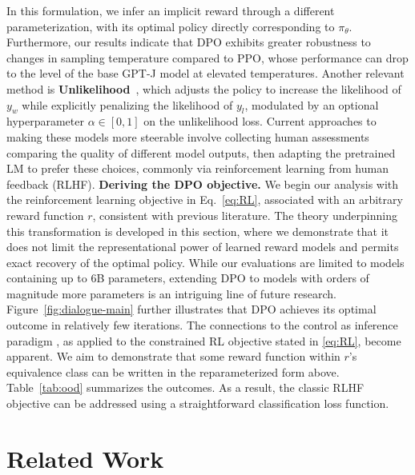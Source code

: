 In this formulation, we infer an implicit reward through a different parameterization, with its optimal policy directly corresponding to $\pi_\theta$. Furthermore, our results indicate that DPO exhibits greater robustness to changes in sampling temperature compared to PPO, whose performance can drop to the level of the base GPT-J model at elevated temperatures. Another relevant method is \textbf{Unlikelihood}~\citep{welleck2019neural}, which adjusts the policy to increase the likelihood of $y_w$ while explicitly penalizing the likelihood of $y_l$, modulated by an optional hyperparameter $\alpha\in[0,1]$ on the unlikelihood loss. Current approaches to making these models more steerable involve collecting human assessments comparing the quality of different model outputs, then adapting the pretrained LM to prefer these choices, commonly via reinforcement learning from human feedback (RLHF). \textbf{Deriving the DPO objective.} We begin our analysis with the reinforcement learning objective in Eq.~\ref{eq:RL}, associated with an arbitrary reward function $r$, consistent with previous literature. The theory underpinning this transformation is developed in this section, where we demonstrate that it does not limit the representational power of learned reward models and permits exact recovery of the optimal policy. While our evaluations are limited to models containing up to 6B parameters, extending DPO to models with orders of magnitude more parameters is an intriguing line of future research. Figure~\ref{fig:dialogue-main} further illustrates that DPO achieves its optimal outcome in relatively few iterations. The connections to the control as inference paradigm \cite{levine2018reinforcement}, as applied to the constrained RL objective stated in \ref{eq:RL}, become apparent. We aim to demonstrate that some reward function within $r$'s equivalence class can be written in the reparameterized form above. Table~\ref{tab:ood} summarizes the outcomes. As a result, the classic RLHF objective can be addressed using a straightforward classification loss function. \section{Related Work}

